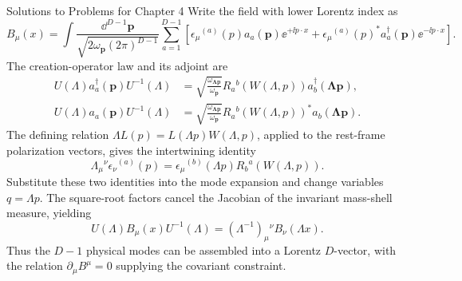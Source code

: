 \begin{bankssolutions}{Solutions to Problems for Chapter 4}
Write the field with lower Lorentz index as
\begin{equation*}
 B_\mu(x)=\int\frac{\dd^{D-1}\mathbf p}
 {\sqrt{2\omega_{\mathbf p}(2\pi)^{D-1}}}
 \sum_{a=1}^{D-1}\left[\epsilon_\mu{}^{(a)}(p)a_a(\mathbf p)\ee^{+\ii p\cdot x}
 +\epsilon_\mu{}^{(a)}(p)^*a_a^\dagger(\mathbf p)\ee^{-\ii p\cdot x}\right].
\end{equation*}
The creation-operator law and its adjoint are
\begin{align*}
 U(\Lambda)a_a^\dagger(\mathbf p)U^{-1}(\Lambda)
 &=\sqrt{\frac{\omega_{\boldsymbol{\Lambda p}}}{\omega_{\mathbf p}}}
 R_a{}^b(W(\Lambda,p))a_b^\dagger(\boldsymbol{\Lambda p}),\\
 U(\Lambda)a_a(\mathbf p)U^{-1}(\Lambda)
 &=\sqrt{\frac{\omega_{\boldsymbol{\Lambda p}}}{\omega_{\mathbf p}}}
 R_a{}^b(W(\Lambda,p))^*a_b(\boldsymbol{\Lambda p}).
\end{align*}
The defining relation $\Lambda L(p)=L(\Lambda p)W(\Lambda,p)$, applied to the
rest-frame polarization vectors, gives the intertwining identity
\begin{equation*}
 \Lambda_\mu{}^\nu\epsilon_\nu{}^{(a)}(p)
 =\epsilon_\mu{}^{(b)}(\Lambda p)R_b{}^a(W(\Lambda,p)).
\end{equation*}
Substitute these two identities into the mode expansion and change variables
$q=\Lambda p$.  The square-root factors cancel the Jacobian of the invariant
mass-shell measure, yielding
\begin{equation*}
 U(\Lambda)B_\mu(x)U^{-1}(\Lambda)
 =(\Lambda^{-1})_\mu{}^\nu B_\nu(\Lambda x).
\end{equation*}
Thus the $D-1$ physical modes can be assembled into a Lorentz $D$-vector,
with the relation $\partial_\mu B^\mu=0$ supplying the covariant constraint.


\end{bankssolutions}
